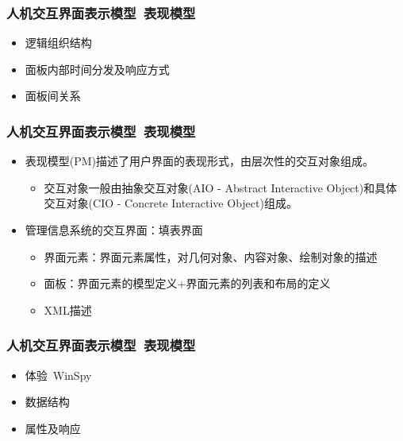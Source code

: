 \documentclass{beamer}
\begin{document}
\begin{frame}
	\frametitle{人机交互界面表示模型~{\small 表现模型}}
	\begin{itemize}
		\item 逻辑组织结构
		\item 面板内部时间分发及响应方式
		\item 面板间关系
	\end{itemize}
\end{frame}

\begin{frame}
	\frametitle{人机交互界面表示模型~{\small 表现模型}}
	\beamertemplatetransparentcovereddynamicmedium
	\begin{itemize}
		\item 表现模型(PM)描述了用户界面的表现形式，由层次性的交互对象组成。
		\begin{itemize}
			\item 交互对象一般由抽象交互对象(AIO - Abstract Interactive Object)和具体交互对象(CIO - Concrete Interactive Object)组成。
		\end{itemize}
		\pause
		\item 管理信息系统的交互界面：填表界面
		\begin{itemize}
			\item 界面元素：界面元素属性，对几何对象、内容对象、绘制对象的描述
			\item 面板：界面元素的模型定义+界面元素的列表和布局的定义
			\item XML描述
		\end{itemize}
	\end{itemize}
\end{frame}

\begin{frame}
	\frametitle{人机交互界面表示模型~{\small 表现模型}}
	\beamertemplatetransparentcovereddynamicmedium
	\begin{itemize}[<+->]
		\item 体验~{\tiny WinSpy}
		\item 数据结构
		\item 属性及响应
	\end{itemize}
\end{frame}
\end{document}
